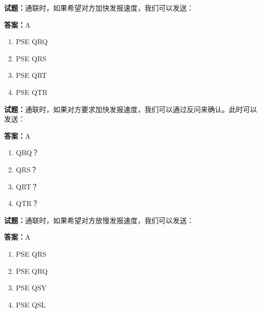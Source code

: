 \documentclass{ctexbook}
\begin{document}




\vspace{1em}

\textbf{试题：}通联时，如果希望对方加快发报速度，我们可以发送： 

\textbf{答案：}A 

\begin{enumerate}[leftmargin=3em]
  \item PSE QRQ 

  \item PSE QRS 

  \item PSE QRT 

  \item PSE QTR 

\end{enumerate}





\vspace{1em}

\textbf{试题：}通联时，如果对方要求加快发报速度，我们可以通过反问来确认。此时可以发送： 

\textbf{答案：}A 

\begin{enumerate}[leftmargin=3em]
  \item QRQ？ 

  \item QRS？ 

  \item QRT？ 


  \item QTR？ 

\end{enumerate}





\vspace{1em}

\textbf{试题：}通联时，如果希望对方放慢发报速度，我们可以发送： 

\textbf{答案：}A 

\begin{enumerate}[leftmargin=3em]
  \item PSE QRS 

  \item PSE QRQ 

  \item PSE QSY 

  \item PSE QSL 

\end{enumerate}
\end{document}
